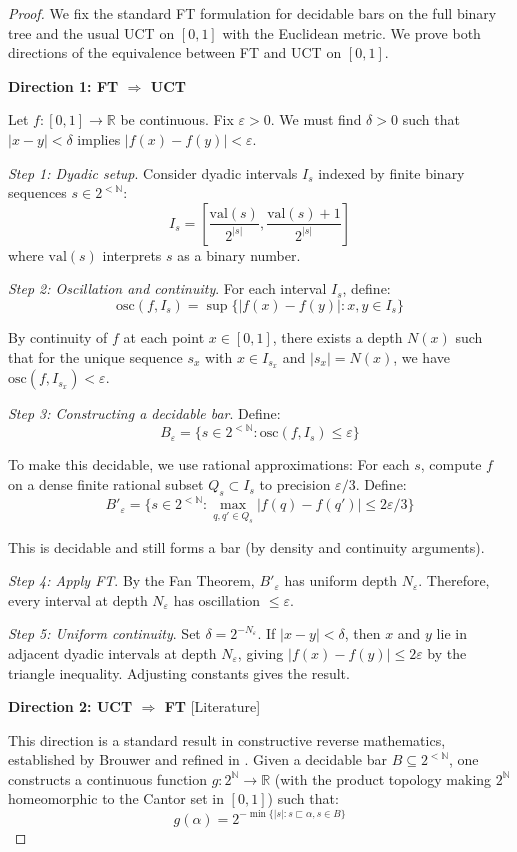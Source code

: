 \documentclass[11pt]{article}
\theoremstyle{plain}
\theoremstyle{definition}
\newcommand{\N}{\mathbb{N}}
\newcommand{\R}{\mathbb{R}}
\newcommand{\leancited}{\textsf{\textcolor{blue!70!black}{[Literature]}}}
\begin{document}
\begin{proof}
We fix the standard FT formulation for decidable bars on the full binary tree and the usual UCT on $[0,1]$ with the Euclidean metric.
We prove both directions of the equivalence between FT and UCT on $[0,1]$.

\textbf{Direction 1: FT $\Rightarrow$ UCT}

Let $f: [0,1] \to \R$ be continuous. Fix $\varepsilon > 0$. We must find $\delta > 0$ such that $|x - y| < \delta$ implies $|f(x) - f(y)| < \varepsilon$.

\emph{Step 1: Dyadic setup}. Consider dyadic intervals $I_s$ indexed by finite binary sequences $s \in 2^{<\N}$:
\[
I_s = \left[\frac{\text{val}(s)}{2^{|s|}}, \frac{\text{val}(s) + 1}{2^{|s|}}\right]
\]
where $\text{val}(s)$ interprets $s$ as a binary number.

\emph{Step 2: Oscillation and continuity}. For each interval $I_s$, define:
\[
\text{osc}(f, I_s) = \sup\{|f(x) - f(y)| : x, y \in I_s\}
\]

By continuity of $f$ at each point $x \in [0,1]$, there exists a depth $N(x)$ such that for the unique sequence $s_x$ with $x \in I_{s_x}$ and $|s_x| = N(x)$, we have $\text{osc}(f, I_{s_x}) < \varepsilon$.

\emph{Step 3: Constructing a decidable bar}. Define:
\[
B_\varepsilon = \{s \in 2^{<\N} : \text{osc}(f, I_s) \leq \varepsilon\}
\]

To make this decidable, we use rational approximations: For each $s$, compute $f$ on a dense finite rational subset $Q_s \subset I_s$ to precision $\varepsilon/3$. Define:
\[
B'_\varepsilon = \{s \in 2^{<\N} : \max_{q, q' \in Q_s} |f(q) - f(q')| \leq 2\varepsilon/3\}
\]

This is decidable and still forms a bar (by density and continuity arguments).

\emph{Step 4: Apply FT}. By the Fan Theorem, $B'_\varepsilon$ has uniform depth $N_\varepsilon$. Therefore, every interval at depth $N_\varepsilon$ has oscillation $\leq \varepsilon$.

\emph{Step 5: Uniform continuity}. Set $\delta = 2^{-N_\varepsilon}$. If $|x - y| < \delta$, then $x$ and $y$ lie in adjacent dyadic intervals at depth $N_\varepsilon$, giving $|f(x) - f(y)| \leq 2\varepsilon$ by the triangle inequality. Adjusting constants gives the result.

\textbf{Direction 2: UCT $\Rightarrow$ FT} \leancited

This direction is a standard result in constructive reverse mathematics, established by Brouwer and refined in \cite{BridgesVita2006, TroelstraVanDalen1988}. Given a decidable bar $B \subseteq 2^{<\N}$, one constructs a continuous function $g: 2^\N \to \R$ (with the product topology making $2^\N$ homeomorphic to the Cantor set in $[0,1]$) such that:
\[
g(\alpha) = 2^{-\min\{|s| : s \sqsubset \alpha, s \in B\}}
\]


\end{proof}
\end{document}
